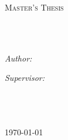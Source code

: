 
\frontmatter
\pagestyle{plain}

\begin{titlepage}
\begin{center}

\vspace*{.06\textheight}
{\scshape\LARGE \univname\par}\vspace{1.5cm}
\textsc{\Large Master's Thesis}\\[0.5cm]

\HRule \\[0.4cm]
{\huge \bfseries \ttitle\par}\vspace{0.4cm}
\HRule \\[1.5cm]

\begin{minipage}[t]{0.4\textwidth}
\begin{flushleft} \large
\emph{Author:}\\
\authorname
\end{flushleft}
\end{minipage}
\begin{minipage}[t]{0.4\textwidth}
\begin{flushright} \large
\emph{Supervisor:}\\
\supname
\end{flushright}
\end{minipage}\\[3cm]

\vfill
\degreename\\[0.4cm]
\deptname\\[2cm]

\vfill
{\large \today}
\vfill

\end{center}
\end{titlepage}

\begin{abstract}
\addchaptertocentry{\abstractname}


\end{abstract}

